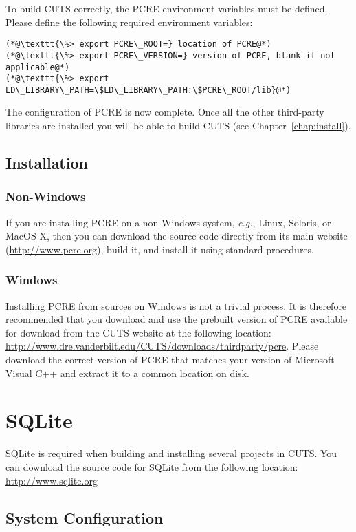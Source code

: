 To build CUTS correctly, the PCRE environment variables must be defined. Please 
define the following required environment variables:
\begin{lstlisting}
(*@\texttt{\%> export PCRE\_ROOT=} location of PCRE@*)
(*@\texttt{\%> export PCRE\_VERSION=} version of PCRE, blank if not applicable@*)
(*@\texttt{\%> export LD\_LIBRARY\_PATH=\$LD\_LIBRARY\_PATH:\$PCRE\_ROOT/lib}@*)
\end{lstlisting}
The configuration of PCRE is now complete. Once all the other
third-party libraries are installed you will be able to build CUTS
(see Chapter~\ref{chap:install}).

\subsection{Installation}

\subsubsection{Non-Windows}
 
If you are installing PCRE on a non-Windows system, \textit{e.g.}, Linux, 
Soloris, or MacOS X, then you can download the source code directly from its
main website (\url{http://www.pcre.org}), build it, and install it using
standard procedures.

\subsubsection{Windows}

Installing PCRE from sources on Windows is not a trivial process. 
It is therefore recommended that you download and use the prebuilt 
version of PCRE available for download from the CUTS website at the 
following location:
\url{http://www.dre.vanderbilt.edu/CUTS/downloads/thirdparty/pcre}. Please download
the correct version of PCRE that matches your version of Microsoft Visual
C++ and extract it to a common location on disk.

\section{SQLite}
\label{sec:thirdparty-sqlite}

SQLite is required when building and installing several 
projects in CUTS. You can download the source code for SQLite
from the following location: \url{http://www.sqlite.org}

\subsection{System Configuration}

